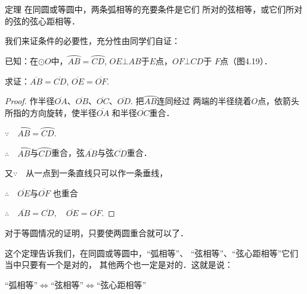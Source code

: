 \begin{blk}
    {定理} 在同圆或等圆中，两条弧相等的充要条件是它们
所对的弦相等，或它们所对的弦的弦心距相等．
\end{blk}

\begin{figure}[htp]
    \centering
    \caption{}
\end{figure}

我们来证条件的必要性，充分性由同学们自证：

已知：在$\odot O$中，$\wideparen{AB}=\wideparen{CD}$, 
$OE\bot  AB$于$E$点，$OF\bot CD$于
$F$点（图4.19）．

求证：$\overline{AB}=\overline{CD}$, $\overline{OE}=\overline{OF}$.

\begin{proof}
    作半径$\overline{OA}$、$\overline{OB}$、$\overline{OC}$、$\overline{OD}$. 把$\wideparen{AB}$连同经过
两端的半径绕着$O$点，依箭头所指的方向旋转，使半径$\overline{OA}$
和半径$\overline{OC}$重合．

$\because\quad \wideparen{AB}=\wideparen{CD}$.

$\therefore\quad \wideparen{AB}$与$\wideparen{CD}$重合，弦$\overline{AB}$与弦$\overline{CD}$重合．

又$\because\quad $从一点到一条直线只可以作一条垂线，

$\therefore\quad \overline{OE}$与$\overline{OF}$
也重合

$\therefore\quad \overline{AB}=\overline{CD},\quad \overline{OE}=\overline{OF}$.
\end{proof}

对于等圆情况的证明，只要使两圆重合就可以了．

这个定理告诉我们，在同圆或等圆中，“弧相等”、
“弦相等”、“弦心距相等”它们当中只要有一个是对的，
其他两个也一定是对的．这就是说：

\begin{blk}{}
   “弧相等”$\Longleftrightarrow$“弦相等”$\Longleftrightarrow$“弦心距相等” 
\end{blk}


